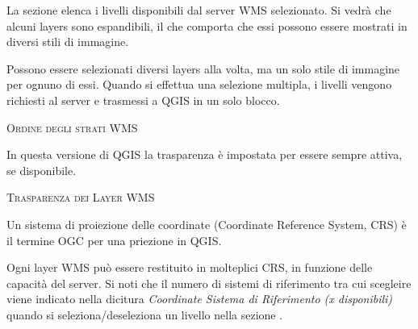 
La sezione  elenca i livelli disponibili dal server WMS
selezionato. Si vedrà che alcuni layers sono espandibili, il che comporta che
essi possono essere mostrati in diversi stili di immagine.

Possono essere selezionati diversi layers alla volta, ma un solo stile di
immagine per ognuno di essi. Quando si effettua una selezione multipla, i
livelli vengono richiesti al server e trasmessi a QGIS in un solo blocco.

\begin{Tip}[ht]\caption{\textsc{Ordine degli strati WMS}}
\end{Tip}

\label{ogc-wms-transparency}

In questa versione di QGIS la trasparenza è impostata per essere sempre
attiva, se disponibile.

\begin{Tip}[ht]\caption{\textsc{Trasparenza dei Layer WMS}}
\end{Tip}


Un sistema di proiezione delle coordinate (Coordinate Reference System, CRS) è
il termine OGC per una priezione in QGIS.

Ogni layer WMS può essere restituito in molteplici CRS, in funzione delle
capacità del server. Si noti che il numero di sistemi di riferimento tra cui
scegleire viene indicato nella dicitura \textsl{Coordinate Sistema di
Riferimento (x disponibili)} quando si seleziona/deseleziona un livello nella
sezione .

